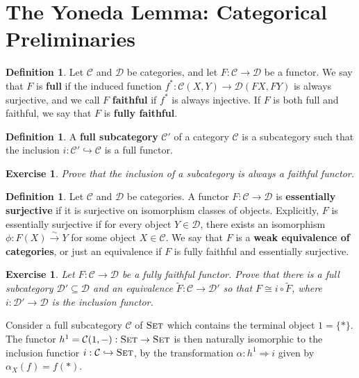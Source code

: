 \documentclass[11pt]{article}
\theoremstyle{plain}
\newtheorem{exrc}[thm]{Exercise}
\theoremstyle{definition}
\newtheorem{defn}[thm]{Definition}
\newcommand{\s}[1]{\mathcal{#1}}
\newcommand{\Set}{{\textsc{Set}}}
\begin{document}
\section{The Yoneda Lemma: Categorical Preliminaries}
\begin{defn}
    Let $\s{C}$ and $\s D$ be categories, and let $F : \s{C} \to \s D$ be a functor. We say that $F$ is \textbf{full} if the induced function $f^* : \s{C}(X,Y) \to \s D(FX,FY)$ is always surjective, and we call $F$ \textbf{faithful} if $f^*$ is always injective. If $F$ is both full and faithful, we say that $F$ is \textbf{fully faithful}.
\end{defn}

\begin{defn}
    A \textbf{full subcategory} $\s{C}'$ of a category $\s{C}$ is a subcategory such that the inclusion $i : \s{C}' \hookrightarrow \s{C}$ is a full functor.
\end{defn}

\begin{exrc}
    Prove that the inclusion of a subcategory is always a faithful functor.
\end{exrc}

\begin{defn}
    Let $\s{C}$ and $\s D$ be categories. A functor $F : \s{C} \to \s D$ is \textbf{essentially surjective} if it is surjective on isomorphism classes of objects. Explicitly, $F$ is essentially surjective if for every object $Y \in \s D$, there exists an isomorphism $\phi : F(X) \xrightarrow{\sim} Y$ for some object $X \in \s{C}$. We say that $F$ is a \textbf{weak equivalence of categories}, or just an equivalence if $F$ is fully faithful and essentially surjective.
\end{defn}

\begin{exrc}
    Let $F : \s{C} \to \s D$ be a fully faithful functor. Prove that there is a full subcategory $\s{D}' \subseteq \s{D}$ and an equivalence $\widetilde{F} : \s{C} \to \s D'$ so that $F \cong i \circ \widetilde{F}$, where $i : \s D' \to \s D$ is the inclusion functor.
\end{exrc}

Consider a full subcategory $\s{C}$ of $\Set$ which contains the terminal object $1 = \{*\}$. The functor $h^1 = \s{C}(1,-) : \Set \to \Set$ is then naturally isomorphic to the inclusion functior $i : \s{C} \hookrightarrow \Set$, by the transformation $\alpha : h^1 \Rightarrow i$ given by $\alpha_X(f) = f(*)$.
\end{document}
